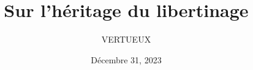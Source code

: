 \documentclass[]{cls/tools}
\begin{document}
\title{Sur l'héritage du libertinage}

\author{VERTUEUX}
\date{Décembre 31, 2023}

\maketitle
\end{document}
